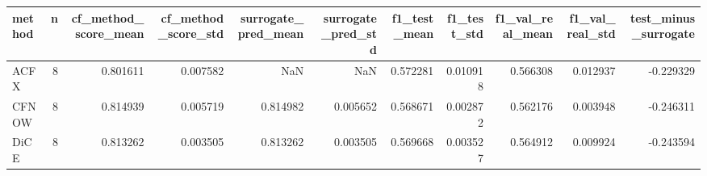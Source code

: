 \begin{tabular}{lrrrrrrrrrr}
\toprule
method &  n &  cf\_method\_score\_mean &  cf\_method\_score\_std &  surrogate\_pred\_mean &  surrogate\_pred\_std &  f1\_test\_mean &  f1\_test\_std &  f1\_val\_real\_mean &  f1\_val\_real\_std &  test\_minus\_surrogate \\
\midrule
  ACFX &  8 &              0.801611 &             0.007582 &                  NaN &                 NaN &      0.572281 &     0.010918 &          0.566308 &         0.012937 &             -0.229329 \\
 CFNOW &  8 &              0.814939 &             0.005719 &             0.814982 &            0.005652 &      0.568671 &     0.002872 &          0.562176 &         0.003948 &             -0.246311 \\
  DiCE &  8 &              0.813262 &             0.003505 &             0.813262 &            0.003505 &      0.569668 &     0.003527 &          0.564912 &         0.009924 &             -0.243594 \\
\bottomrule
\end{tabular}
